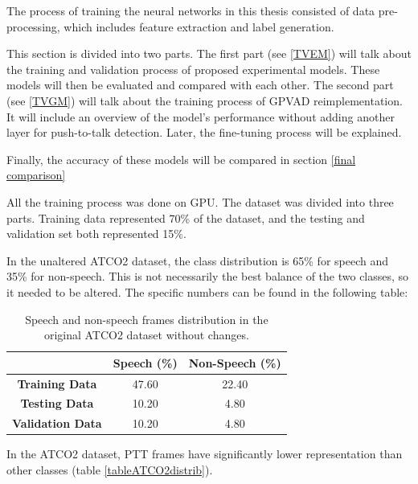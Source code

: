     The process of training the neural networks in this thesis consisted of data pre-processing, which includes feature extraction and label generation.

    This section is divided into two parts. The first part (see \ref{TVEM}) will talk about the training and validation process of proposed experimental models. These models will then be evaluated and compared with each other. The second part (see \ref{TVGM})  will talk about the training process of GPVAD reimplementation. It will include an overview of the model's performance without adding another layer for push-to-talk detection. Later, the fine-tuning process will be explained. 
    
    Finally, the accuracy of these models will be compared in section \ref{final comparison}

    All the training process was done on GPU. The dataset was divided into three parts. Training data represented 70\% of the dataset, and the testing and validation set both represented 15\%. 

    In the unaltered ATCO2 dataset, the class distribution is 65\% for speech and 35\% for non-speech. This is not necessarily the best balance of the two classes, so it needed to be altered.
    The specific numbers can be found in the following table:

    \vspace{0.2cm}

    \begin{table}[!h]
        \begin{center}
        \begin{tabular}{|c|c|c|}\hline 
            & \textbf{Speech (\%)} & \textbf{Non-Speech (\%)} \\ \hline
            \textbf{Training Data} & 47.60 & 22.40 \\ \hline
            \textbf{Testing Data} & 10.20 & 4.80 \\ \hline
            \textbf{Validation Data} & 10.20 & 4.80 \\ \hline
        \end{tabular}
        \caption{Speech and non-speech frames distribution in the original ATCO2 dataset without changes.}
        \label{tableVAD}
        \end{center}
    \end{table}
    
    In the ATCO2 dataset, PTT frames have significantly lower representation than other classes (table \ref{tableATCO2distrib}).

